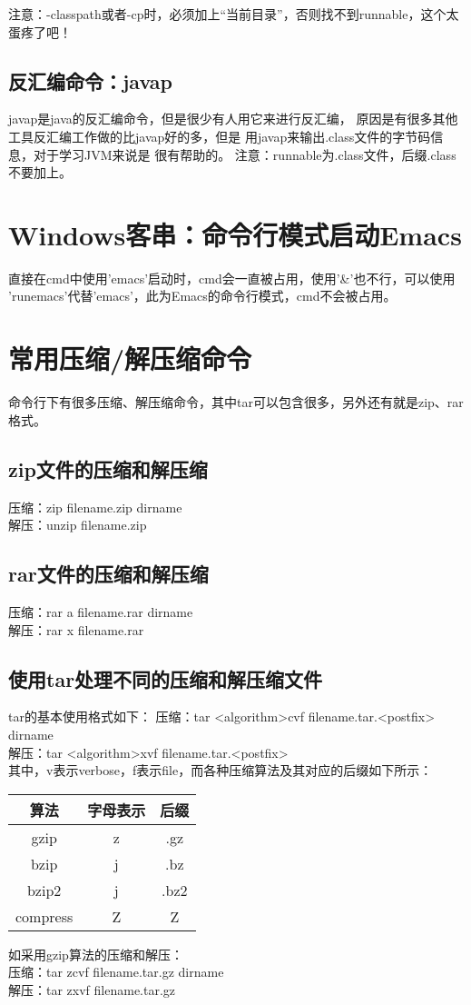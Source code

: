 ﻿\documentclass[a4paper,11pt]{article}
\begin{document}
  注意：-classpath或者-cp时，必须加上“当前目录”，否则找不到runnable，这个太蛋疼了吧！

  \subsection[反汇编命令：javap]{反汇编命令：javap}
  javap是java的反汇编命令，但是很少有人用它来进行反汇编，
  原因是有很多其他工具反汇编工作做的比javap好的多，但是
  用javap来输出.class文件的字节码信息，对于学习JVM来说是
  很有帮助的。
  注意：runnable为.class文件，后缀.class不要加上。

  \section[Windows客串：命令行模式启动Emacs]{Windows客串：命令行模式启动Emacs}
  直接在cmd中使用'emacs'启动时，cmd会一直被占用，使用'\&'也不行，可以使用
  'runemacs'代替'emacs'，此为Emacs的命令行模式，cmd不会被占用。

  \section[常用压缩/解压缩命令]{常用压缩/解压缩命令}
  命令行下有很多压缩、解压缩命令，其中tar可以包含很多，另外还有就是zip、rar格式。
  \subsection[zip文件的压缩和解压缩]{zip文件的压缩和解压缩}
  压缩：zip filename.zip dirname\\
  解压：unzip filename.zip
  \subsection[rar文件的压缩和解压缩]{rar文件的压缩和解压缩}
  压缩：rar a filename.rar dirname\\
  解压：rar x filename.rar
  \subsection[使用tar处理不同的压缩和解压缩文件]{使用tar处理不同的压缩和解压缩文件}
  tar的基本使用格式如下：
  压缩：tar <algorithm>cvf filename.tar.<postfix> dirname\\
  解压：tar <algorithm>xvf filename.tar.<postfix>\\
  其中，v表示verbose，f表示file，而各种压缩算法及其对应的后缀如下所示：\par
  \begin{center}
  \begin{tabular}{ccc}
    \hline
    算法 & 字母表示 & 后缀\\ \hline
    gzip & z & .gz\\
    bzip & j & .bz\\
    bzip2 & j & .bz2\\
    compress & Z & Z\\ \hline
  \end{tabular}
  \end{center}
  如采用gzip算法的压缩和解压：\\
  压缩：tar zcvf filename.tar.gz dirname\\
  解压：tar zxvf filename.tar.gz
\end{document}
